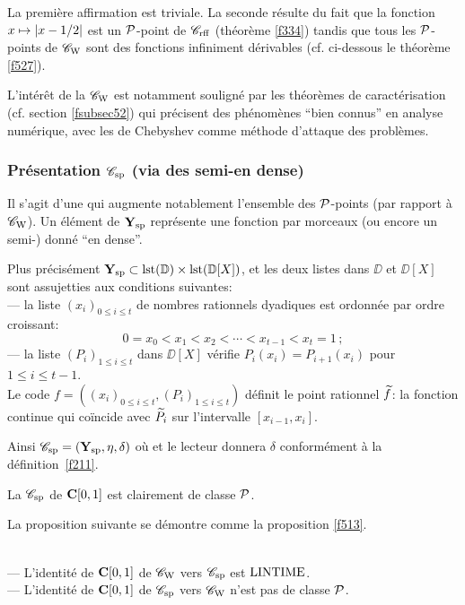 \proof La première affirmation est triviale. 
La seconde résulte du fait que la fonction  $x \mapsto \left|{ x-1/2}\right| $  est 
un  ${\cal P}$-point de  ${{{\mathscr C}}_{\rm rff}}$  (théorème \ref{f334}) tandis que tous les 
${\cal P}$-points de  ${{{\mathscr C}}_{\rm W}}$  sont des fonctions infiniment dérivables 
(cf. ci-dessous le théorème \ref{f527}).  \eop 

\smallskip L'intérêt de la \pres   ${{{\mathscr C}}_{\rm W}}$  est notamment souligné par les 
théorèmes de caractérisation (cf. section \ref{fsubsec52}) 
qui précisent des phénomènes ``bien connus'' en analyse numérique, avec 
les \pols de Chebyshev comme méthode d'attaque des problèmes.



\subsubsection{Présentation   \texorpdfstring{${{{\mathscr C}}_{\rm sp}}$}{Csp}
(via des semi-\pols en \pres 
dense)}\label{fsubsubsec512}
Il s'agit d'une \pres qui augmente notablement l'ensemble des ${\cal P}$-points (par 
rapport à~${{{\mathscr C}}_{\rm W}}$). Un élément de  ${{\bf Y}_{\rm sp}}$   représente une fonction 
\polle par morceaux (ou encore un  semi-\pol) donné ``en \pres 
dense''. 

Plus précisément ${{\bf Y}_{\rm sp}} \subset {\rm lst}(\mathbb {D}) \times {\rm lst}(\mathbb {D}[X])$, et les 
deux listes dans $\DD$ et $\DD[X]$ sont assujetties aux conditions 
suivantes:\\
--- la liste  $(x_i)_{0 \leq i \leq t}$ de nombres rationnels dyadiques est 
ordonnée par ordre croissant: 
$$0 = x_0 < x_1 < x_2 <\cdots< x_{t-1} < x_t =1\,;$$
--- la liste  $(P_i)_{1 \leq i \leq t}$ dans $\DD[X]$
vérifie  $P_i(x_i) = P_{i+1}(x_i)$  pour  $ 1 \leq i \leq t-1$.\\
Le code $f = ((x_i)_{0 \leq i \leq t},(P_i)_{1 \leq i \leq t})$ 
définit le point rationnel  $\widetilde{f}$: la fonction continue qui coïncide avec $\widetilde{P_i}$ sur l'intervalle $[x_{i-1},x_i]$. 

\smallskip Ainsi ${{{\mathscr C}}_{\rm sp}}=({{\bf Y}_{\rm sp}},\eta,\delta)$ où  et le lecteur donnera  $\delta$ conformément à la définition~\ref{f211}.

\smallskip La \pres  ${{{\mathscr C}}_{\rm sp}}$  de  ${{\bf C}[0,1]}$  est clairement de classe  ${\cal P}$.

La proposition suivante se démontre comme la proposition \ref{f513}.

\begin{fproposition} \label{f514} ~\\
--- L'identité de  ${{\bf C}[0,1]}$  de  ${{{\mathscr C}}_{\rm W}}$  vers  ${{{\mathscr C}}_{\rm sp}}$  est  ${\rm LINTIME} $.\\
--- L'identité de  ${{\bf C}[0,1]}$  de  ${{{\mathscr C}}_{\rm sp}}$  vers  ${{{\mathscr C}}_{\rm W}}$  n'est pas de classe  ${\cal P}$.
\end{fproposition} 

